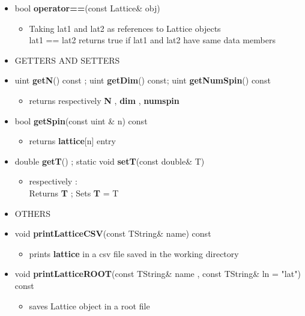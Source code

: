 \begin{itemize}
\begin{itemize}
			\item[] bool \textbf{operator==}(const Lattice\& obj) 		 
			\begin{itemize}
				\item[] Taking \textsf{lat1} and \textsf{lat2} as references to Lattice objects \\
						\textsf{lat1 == lat2} returns true if \textsf{lat1} and \textsf{lat2} have same data members
			\end{itemize}
			
\newpage			
			
		\item[] 
		GETTERS AND SETTERS \\
					
			\item[] uint \textbf{getN}() const ; uint \textbf{getDim}() const; uint \textbf{getNumSpin}() const 	
			\begin{itemize}
			\item[] returns respectively \textbf{N} , \textbf{dim} , \textbf{num\textunderscore spin} 
			\end{itemize}			
			
			\item[] bool \textbf{getSpin}(const uint \& n) const 		 
			\begin{itemize}
				\item[] returns \textbf{lattice}[n] entry
			\end{itemize}
					
			\item[] double \textbf{getT}() ; static void \textbf{setT}(const double\& \textunderscore T)	
			\begin{itemize}
				\item[] respectively : \\ 
						Returns \textbf{T} ; Sets \textbf{T} = \textunderscore T \\
			\end{itemize}
			
		\item[] 
		OTHERS \\
			
			\item[] void \textbf{printLatticeCSV}(const TString\& name) const		 
			\begin{itemize}
				\item[] prints \textbf{lattice} in a csv file saved in the working directory
			\end{itemize}
			
			\item[] 
			{\small			
			void \textbf{printLatticeROOT}(const TString\& name , const TString\& ln = "lat") const	
			}			
			\begin{itemize}
				\item[] saves Lattice object in a root file 
			\end{itemize}
			
	\end{itemize}

	
\end{itemize}

